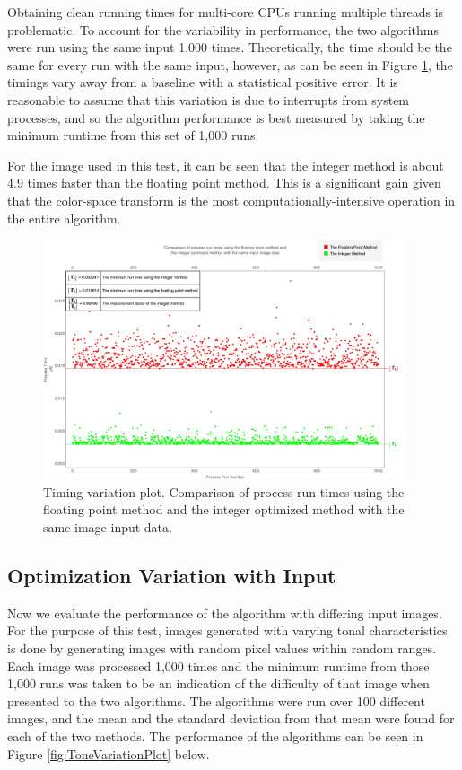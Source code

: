 Obtaining clean running times for multi-core CPUs running multiple threads is problematic. To account for the variability in performance, the two algorithms were run using the same input 1,000 times. Theoretically, the time should be the same for every run with the same input, however, as can be seen in Figure \ref{fig:TimingVariationPlot}, the timings vary away from a baseline with a statistical positive error. It is reasonable to assume that this variation is due to interrupts from system processes, and so the algorithm performance is best measured by taking the minimum runtime from this set of 1,000 runs. 

For the image used in this test, it can be seen that the integer method is about 4.9 times faster than the floating point method. This is a significant gain given that the color-space transform is the most computationally-intensive operation in the entire algorithm.

\begin{figure}[h!]
  \centering
    \includegraphics[width=0.95\textwidth]{Chapter5/Figs/Timing_Variation_Plot.jpg}
    \caption{Timing variation plot. Comparison of process run times using the floating point method and the integer optimized method with the same image input data.}\label{fig:TimingVariationPlot}
\end{figure}

\subsection{Optimization Variation with Input}\label{sec:OptimizationVariationWithInput}

Now we evaluate the performance of the algorithm with differing input images. For the purpose of this test, images generated with varying tonal characteristics is done by generating images with random pixel values within random ranges. Each image was processed 1,000 times and the minimum runtime from those 1,000 runs was taken to be an indication of the difficulty of that image when presented to the two algorithms. The algorithms were run over 100 different images, and the mean and the standard deviation from that mean were found for each of the two methods. The performance of the algorithms can be seen in Figure \ref{fig:ToneVariationPlot} below.

